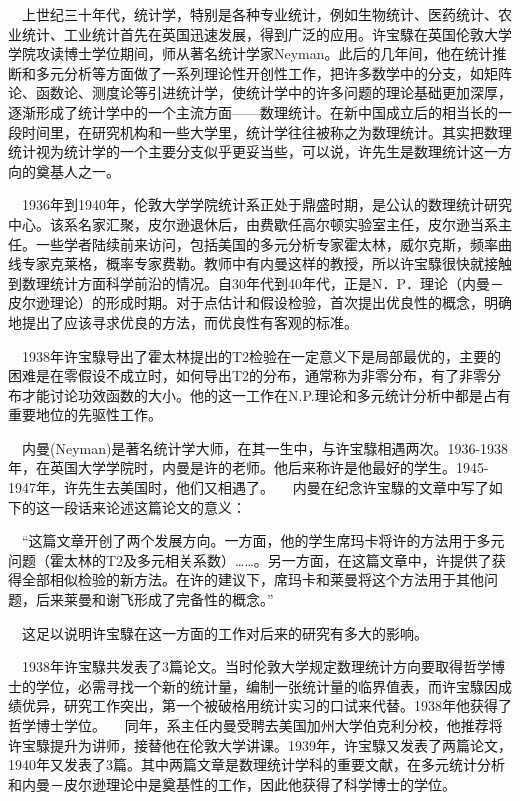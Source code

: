 \documentclass[a4paper,AutoFakeBold,oneside,12pt]{article}
\begin{document}
$\quad$上世纪三十年代，统计学，特别是各种专业统计，例如生物统计、医药统计、农业统计、工业统计首先在英国迅速发展，得到广泛的应用。许宝騄在英国伦敦大学学院攻读博士学位期间，师从著名统计学家Neyman。此后的几年间，他在统计推断和多元分析等方面做了一系列理论性开创性工作，把许多数学中的分支，如矩阵论、函数论、测度论等引进统计学，使统计学中的许多问题的理论基础更加深厚，逐渐形成了统计学中的一个主流方面——数理统计。在新中国成立后的相当长的一段时间里，在研究机构和一些大学里，统计学往往被称之为数理统计。其实把数理统计视为统计学的一个主要分支似乎更妥当些，可以说，许先生是数理统计这一方向的奠基人之一。

	$\quad$1936年到1940年，伦敦大学学院统计系正处于鼎盛时期，是公认的数理统计研究中心。该系名家汇聚，皮尔逊退休后，由费歇任高尔顿实验室主任，皮尔逊当系主任。一些学者陆续前来访问，包括美国的多元分析专家霍太林，威尔克斯，频率曲线专家克莱格，概率专家费勒。教师中有内曼这样的教授，所以许宝騄很快就接触到数理统计方面科学前沿的情况。自30年代到40年代，正是N．P．理论（内曼－皮尔逊理论）的形成时期。对于点估计和假设检验，首次提出优良性的概念，明确地提出了应该寻求优良的方法，而优良性有客观的标准。

$\quad$1938年许宝騄导出了霍太林提出的T2检验在一定意义下是局部最优的，主要的困难是在零假设不成立时，如何导出T2的分布，通常称为非零分布，有了非零分布才能讨论功效函数的大小。他的这一工作在N.P.理论和多元统计分析中都是占有重要地位的先驱性工作。

$\quad$内曼(Neyman)是著名统计学大师，在其一生中，与许宝騄相遇两次。1936-1938年，在英国大学学院时，内曼是许的老师。他后来称许是他最好的学生。1945-1947年，许先生去美国时，他们又相遇了。
	$\quad$内曼在纪念许宝騄的文章中写了如下的这一段话来论述这篇论文的意义： 

$\quad$“这篇文章开创了两个发展方向。一方面，他的学生席玛卡将许的方法用于多元问题（霍太林的T2及多元相关系数）……。另一方面，在这篇文章中，许提供了获得全部相似检验的新方法。在许的建议下，席玛卡和莱曼将这个方法用于其他问题，后来莱曼和谢飞形成了完备性的概念。” 

$\quad$这足以说明许宝騄在这一方面的工作对后来的研究有多大的影响。

$\quad$1938年许宝騄共发表了3篇论文。当时伦敦大学规定数理统计方向要取得哲学博士的学位，必需寻找一个新的统计量，编制一张统计量的临界值表，而许宝騄因成绩优异，研究工作突出，第一个被破格用统计实习的口试来代替。1938年他获得了哲学博士学位。
	$\quad$同年，系主任内曼受聘去美国加州大学伯克利分校，他推荐将许宝騄提升为讲师，接替他在伦敦大学讲课。1939年，许宝騄又发表了两篇论文，1940年又发表了3篇。其中两篇文章是数理统计学科的重要文献，在多元统计分析和内曼－皮尔逊理论中是奠基性的工作，因此他获得了科学博士的学位。
\end{document}
